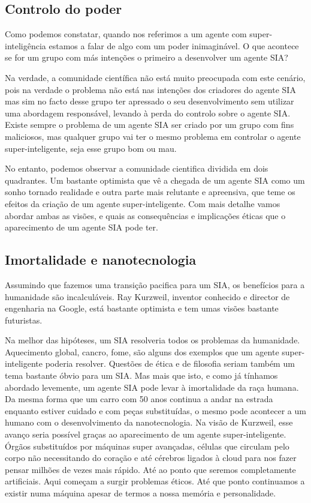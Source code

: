 \documentclass[runningheads,a4paper]{llncs}
\begin{document}
\subsection{Controlo do poder}

Como podemos constatar, quando nos referimos a um agente com super-inteligência estamos a falar de algo com um poder inimaginável. O que acontece se for um grupo com más intenções o primeiro a desenvolver um agente SIA?\@

Na verdade, a comunidade científica não está muito preocupada com este cenário, pois na verdade o problema não está nas intenções dos criadores do agente SIA mas sim no facto desse grupo ter apressado o seu desenvolvimento sem utilizar uma abordagem responsável, levando à perda do controlo sobre o agente SIA\@. Existe sempre o problema de um agente SIA ser criado por um grupo com fins maliciosos, mas qualquer grupo vai ter o mesmo problema em controlar o agente super-inteligente, seja esse grupo bom ou mau.

No entanto, podemos observar a comunidade cientifica dividida em dois quadrantes. Um bastante optimista que vê a chegada de um agente SIA como um sonho tornado realidade e outra parte mais relutante e apreensiva, que teme os efeitos da criação de um agente super-inteligente. Com mais detalhe vamos abordar ambas as visões, e quais as consequências e implicações éticas que o aparecimento de um agente SIA pode ter.

\subsection{Imortalidade e nanotecnologia}

Assumindo que fazemos uma transição pacifica para um SIA, os benefícios para a humanidade são incalculáveis. Ray Kurzweil, inventor conhecido e director de engenharia na Google, está bastante optimista e tem umas visões bastante futuristas.

Na melhor das hipóteses, um SIA resolveria todos os problemas da humanidade. Aquecimento global, cancro, fome, são alguns dos exemplos que um agente super-inteligente poderia resolver. Questões de ética e de filosofia seriam também um tema bastante óbvio para um SIA\@.
Mas mais que isto, e como já tínhamos abordado levemente, um agente SIA pode levar à imortalidade da raça humana. Da mesma forma que um carro com 50 anos continua a andar na estrada enquanto estiver cuidado e com peças substituídas, o mesmo pode acontecer a um humano com o desenvolvimento da nanotecnologia. Na visão de Kurzweil, esse avanço seria possível graças ao aparecimento de um agente super-inteligente. Órgãos substituídos por máquinas super avançadas, células que circulam pelo corpo não necessitando do coração e até cérebros ligados à cloud para nos fazer pensar milhões de vezes mais rápido. Até ao ponto que seremos completamente artificiais. Aqui começam a surgir problemas éticos. Até que ponto continuamos a existir numa máquina apesar de termos a nossa memória e personalidade.
\end{document}
